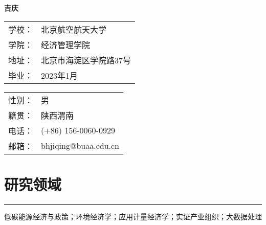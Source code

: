\documentclass[letterpaper]{article}
\def\name{吉庆}
\renewenvironment{itemize}{
  \begin{list}{}{
    \setlength{\leftmargin}{0.2in}
    \setlength{\itemsep}{0.15in}
    \setlength{\parskip}{0.05in}
    \setlength{\parsep}{0.05in}
  }
}{
  \end{list}
}
\begin{document}
{\huge \bf \name}

\bigskip

\begin{minipage}[t]{0.4\linewidth}
  \centering
    \begin{tabular}{ll}
      学校：& 北京航空航天大学 \\
      学院：& 经济管理学院 \\
      地址：& 北京市海淀区学院路37号 \\
      毕业：& 2023年1月
    \end{tabular}
\end{minipage}
\begin{minipage}[t]{0.45\linewidth}
  \centering
    \begin{tabular}{ll}
      性别：& 男 \\
      籍贯：& 陕西渭南 \\
      电话：& (+86) 156-0060-0929 \\
      邮箱：& bhjiqing@buaa.edu.cn
    \end{tabular}
\end{minipage}

\section*{研究领域}
\hrule
\vspace{0.25cm}
  \begin{itemize}
    \item 低碳能源经济与政策；环境经济学；应用计量经济学；实证产业组织；大数据处理
  \end{itemize}
\end{document}
